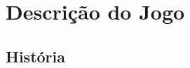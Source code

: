 \documentclass[a4paper]{article}
\begin{document}
\thispagestyle{empty}


\newpage

%
%
%
%
%
%
%



\newpage
\tableofcontents
\newpage

\section{Descrição do Jogo}
\subsection{História}
\end{document}
